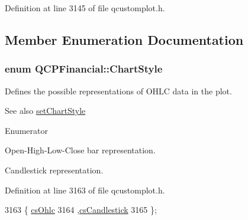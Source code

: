 Definition at line 3145 of file qcustomplot.\+h.



\subsection{Member Enumeration Documentation}
\hypertarget{class_q_c_p_financial_a0f800e21ee98d646dfc6f8f89d10ebfb}{}
\subsubsection[{Chart\+Style}]{\setlength{\rightskip}{0pt plus 5cm}enum {\bf Q\+C\+P\+Financial\+::\+Chart\+Style}}\label{class_q_c_p_financial_a0f800e21ee98d646dfc6f8f89d10ebfb}
Defines the possible representations of O\+H\+L\+C data in the plot.

\begin{DoxySeeAlso}{See also}
\hyperlink{class_q_c_p_financial_a5a59175d36279d71596e64d7bb65596f}{set\+Chart\+Style} 
\end{DoxySeeAlso}
\begin{Desc}
\item[Enumerator]\par
\begin{description}
\item[{\em 
\hypertarget{class_q_c_p_financial_a0f800e21ee98d646dfc6f8f89d10ebfba3a516016c9298d3e95dd82aa203c4390}{}cs\+Ohlc\label{class_q_c_p_financial_a0f800e21ee98d646dfc6f8f89d10ebfba3a516016c9298d3e95dd82aa203c4390}
}]Open-\/\+High-\/\+Low-\/\+Close bar representation. \item[{\em 
\hypertarget{class_q_c_p_financial_a0f800e21ee98d646dfc6f8f89d10ebfbac803cbd39f26e3f206bcc7028679e62f}{}cs\+Candlestick\label{class_q_c_p_financial_a0f800e21ee98d646dfc6f8f89d10ebfbac803cbd39f26e3f206bcc7028679e62f}
}]Candlestick representation. \end{description}
\end{Desc}


Definition at line 3163 of file qcustomplot.\+h.


\begin{DoxyCode}
3163                   \{ \hyperlink{class_q_c_p_financial_a0f800e21ee98d646dfc6f8f89d10ebfba3a516016c9298d3e95dd82aa203c4390}{csOhlc}         
3164                    ,\hyperlink{class_q_c_p_financial_a0f800e21ee98d646dfc6f8f89d10ebfbac803cbd39f26e3f206bcc7028679e62f}{csCandlestick}  
3165                   \};
\end{DoxyCode}


